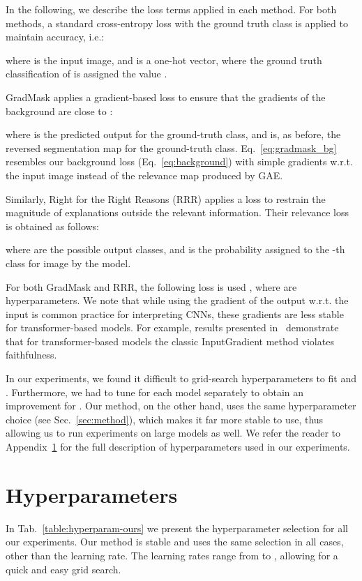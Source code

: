 \documentclass{article}
\begin{document}
In the following, we describe the loss terms applied in each method.
For both methods, a standard cross-entropy loss with the ground truth class is applied to maintain accuracy, i.e.:

where  is the input image, and  is a one-hot vector, where the ground truth classification of  is assigned the value .

GradMask applies a gradient-based loss to ensure that the gradients of the background are close to :

where  is the predicted output for the ground-truth class, and  is, as before, the reversed segmentation map for the ground-truth class.
Eq.~\ref{eq:gradmask_bg} resembles our background loss (Eq.~\ref{eq:background}) with simple gradients w.r.t. the input image instead of the relevance map produced by GAE.

Similarly, Right for the Right Reasons (RRR) applies a loss to restrain the magnitude of explanations outside the relevant information. Their relevance loss is obtained as follows:

where  are the possible output classes, and  is the probability assigned to the -th class for image  by the model.

For both GradMask and RRR, the following loss is used ,
where  are hyperparameters. We note that while using the gradient of the output w.r.t. the input is common practice for interpreting CNNs, these gradients are less stable for transformer-based models. For example, results presented in~\cite{Liu2022RethinkingAE} demonstrate that for transformer-based models the classic InputGradient method violates faithfulness. 

In our experiments, we found it difficult to grid-search hyperparameters to fit  and . Furthermore, we had to tune  for each model separately to obtain an improvement for . Our method, on the other hand, uses the same hyperparameter choice (see Sec.~\ref{sec:method}), which makes it far more stable to use, thus allowing us to run experiments on large models as well. We refer the reader to Appendix~\ref{sec:hyperparameters} for the full description of hyperparameters used in our experiments. 

\clearpage

\section{Hyperparameters}
\label{sec:hyperparameters}
In Tab.~\ref{table:hyperparam-ours} we present the hyperparameter selection for all our experiments. Our method is stable and uses the same selection in all cases, other than the learning rate. The learning rates range from  to , allowing for a quick and easy grid search.
\end{document}
